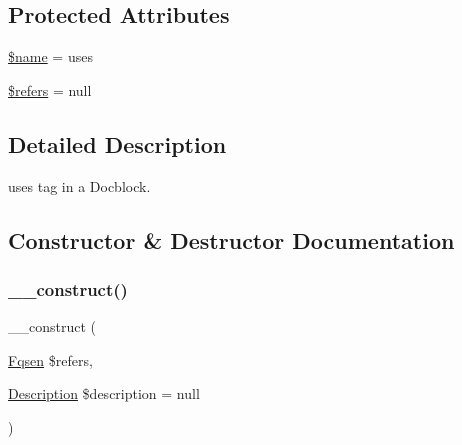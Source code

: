 \subsection*{Protected Attributes}
\begin{DoxyCompactItemize}
\item 
\mbox{\hyperlink{classphp_documentor_1_1_reflection_1_1_doc_block_1_1_tags_1_1_uses_ab2fc40d43824ea3e1ce5d86dee0d763b}{\$name}} = \textquotesingle{}uses\textquotesingle{}
\item 
\mbox{\hyperlink{classphp_documentor_1_1_reflection_1_1_doc_block_1_1_tags_1_1_uses_a7d314abc99768996ac1e3dad789818f6}{\$refers}} = null
\end{DoxyCompactItemize}


\subsection{Detailed Description}
uses tag in a Docblock. 

\subsection{Constructor \& Destructor Documentation}
\mbox{\label{classphp_documentor_1_1_reflection_1_1_doc_block_1_1_tags_1_1_uses_a606211073a6fa4ef434859f156764469}} 
\subsubsection{\texorpdfstring{\+\_\+\+\_\+construct()}{\_\_construct()}}
{\footnotesize\ttfamily \+\_\+\+\_\+construct (\begin{DoxyParamCaption}\item[{\mbox{\hyperlink{classphp_documentor_1_1_reflection_1_1_fqsen}{Fqsen}}}]{\$refers,  }\item[{\mbox{\hyperlink{classphp_documentor_1_1_reflection_1_1_doc_block_1_1_description}{Description}}}]{\$description = {\ttfamily null} }\end{DoxyParamCaption})}


